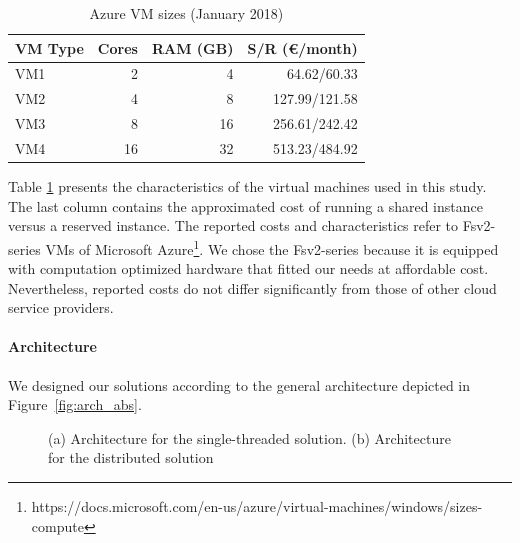 {\begin{table}[ht]
  \centering
    \caption{Azure VM sizes (January 2018)}
  \begin{tabular}{@{}lrrr@{}} \toprule
  VM Type & Cores & RAM (GB) & S/R (\euro/month)\\
    \midrule
  VM1 & 2 & 4 & 64.62/60.33\\
  VM2 & 4 & 8 & 127.99/121.58\\
  VM3 & 8 & 16 & 256.61/242.42\\
  VM4 & 16 & 32 & 513.23/484.92\\
    \bottomrule
  \end{tabular}
    \label{tab:sizes}
\end{table}

Table \ref{tab:sizes} presents the characteristics of the virtual machines used in this study. The last column contains the approximated cost of running a shared instance versus a reserved instance. 
The reported costs and characteristics refer to Fsv2-series VMs of Microsoft Azure\footnote{https://docs.microsoft.com/en-us/azure/virtual-machines/windows/sizes-compute}. We chose the Fsv2-series because it is equipped with computation optimized hardware that fitted our needs at affordable cost.
Nevertheless, reported costs do not differ significantly from those of other cloud service providers. 

\paragraph{Architecture}
We designed our solutions according to the general architecture depicted in Figure~\ref{fig:arch_abs}. 

\begin{figure}[ht]
\caption{(a) Architecture for the single-threaded solution. (b) Architecture for the distributed solution}
\label{fig:arch_impl}
\end{figure}

}
